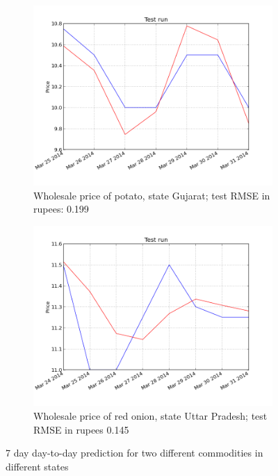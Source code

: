 \begin{figure}[!ht]
    \centering
        \begin{subfigure}[b]{.45\linewidth}
        \centering
        \includegraphics[width=\textwidth]{./img/plots/esn/daily/gujarat_potato_online_7d_1d.png}
        \caption{Wholesale price of potato, state Gujarat; test RMSE in rupees: 0.199} 
        \label{subfig:res_7d_1}
        \end{subfigure}
        \quad
        \begin{subfigure}[b]{.45\linewidth}
        \centering
        \includegraphics[width=\textwidth]{./img/plots/esn/daily/uttar_pradesh_redonion_7d_1d.png}
        \caption{Wholesale price of red onion, state Uttar Pradesh; test RMSE in rupees 0.145}
        \label{subfig:res_7d_2}
        \end{subfigure}
    \caption{7 day day-to-day prediction for two different commodities in different states}   
    \label{fig:res_7d}
\end{figure}

